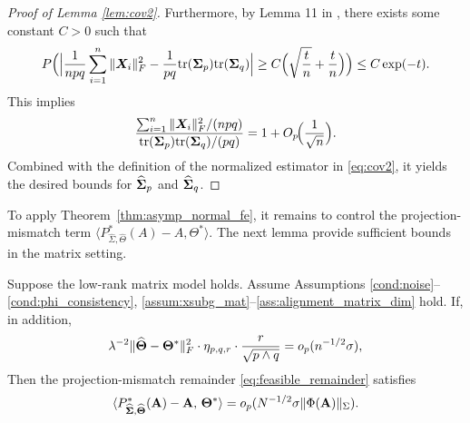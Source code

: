 \documentclass[authoryear,preprint,review,12pt]{elsarticle}
\begin{document}
\begin{proof}[Proof of Lemma \ref{lem:cov2}]
	
	Furthermore, by Lemma 11 in \citet{Ke2025}, there exists some constant $C>0$ such that
	\[
	P\Big(\Big|\frac{1}{npq}\sum_{i=1}^n \|\boldsymbol X_i\|_F^2
	- \frac{1}{pq} \mbox{tr}(\mathbf{ \Sigma}_p)\mbox{tr}(\mathbf{ \Sigma}_q)\Big|
	\ge C\Big(\sqrt{\frac{t}{n}}+\frac{t}{n}\Big)\Big)\le C\exp(-t).
	\]
	This implies
	\[
	\frac{\sum_{i=1}^n \|\boldsymbol X_i\|_F^2 /(npq)}{\mbox{tr}(\mathbf{ \Sigma}_p)\mbox{tr}(\mathbf{ \Sigma}_q)/(pq)} = 1+O_p\!\Big(\frac{1}{\sqrt n}\Big).
	\] 
	Combined with the definition of the normalized estimator in \eqref{eq:cov2}, it
	yields the desired bounds for $\widehat{\mathbf{ \Sigma}}_p$ and $\widehat{\mathbf{ \Sigma}}_q$.
\end{proof}

{ 
	To apply Theorem~\ref{thm:asymp_normal_fe}, it remains to control the projection-mismatch term
	$\langle P_{\widehat{\Sigma},\widehat{\Theta}}^\ast(A)-A, \Theta^\ast\rangle$.
	The next lemma provide sufficient bounds in the matrix setting. 
	
}

{  
	
	\begin{Lemma}
		\label{lem:proj_mismatch_matrix}
		Suppose the low-rank matrix model holds.  Assume Assumptions \ref{cond:noise}--\ref{cond:phi_consistency}, \ref{assum:xsubg_mat}--\ref{ass:alignment_matrix_dim} hold.
		If, in addition,
		\[
		\lambda^{-2}\|\widehat{\mathbf{\Theta}}-\mathbf{\Theta}^\ast\|_F^2\cdot 	\eta_{p,q,r}\cdot\frac{r}{\sqrt{p\wedge q}}
		=
		o_p(n^{-1/2}\sigma),
		\]
		Then the projection-mismatch remainder \eqref{eq:feasible_remainder} satisfies
		\[
		\langle 
		P_{\widehat{\mathbf{ \Sigma}},\widehat{\mathbf{\Theta}}}^\ast(\mathbf{A})-\mathbf{A},\, \mathbf{\Theta}^\ast
		\rangle
		=
		o_p (N^{-1/2}\sigma\|\Phi(\mathbf{A})\|_\Sigma).
		\]
\end{Lemma}	} 
\end{document}
